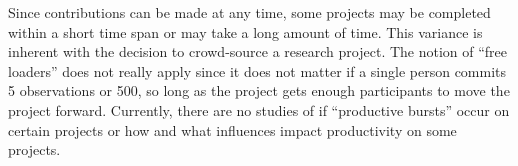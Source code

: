 Since contributions can be made at any time, some projects may be completed within a short time span or may take a long amount of time. This variance is inherent with the decision to crowd-source a research project. The notion of “free loaders” does not really apply since it does not matter if a single person commits 5 observations or 500, so long as the project gets enough participants to move the project forward. Currently, there are no studies of if “productive bursts” occur on certain projects or how and what influences impact productivity on some projects.
